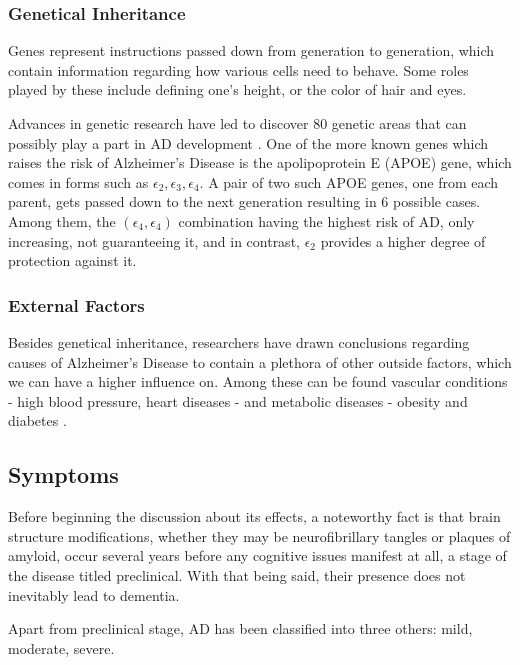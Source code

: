 \documentclass[a4paper, 12pt]{article}
\begin{document}
\subsubsection*{Genetical Inheritance} %
Genes represent instructions passed down from generation to generation, which contain information regarding how various cells
need to behave. Some roles played by these include defining one's height, or the color of hair and eyes.

Advances in genetic research have led to discover 80 genetic areas that can possibly play a part in AD development \cite{NIH2}.
One of the more known genes which raises the risk of Alzheimer's Disease is the apolipoprotein E (APOE) gene, which comes in forms such as
$\epsilon_2, \epsilon_3, \epsilon_4$. A pair of two such APOE genes, one from each parent, gets passed down to the next generation
resulting in 6 possible cases. Among them, the $\left(\epsilon_4,\epsilon_4\right)$ combination having the highest risk of AD,
only increasing, not guaranteeing it, and in contrast, $\epsilon_2$ provides a higher degree of protection against it.

\subsubsection*{External Factors} %
Besides genetical inheritance, researchers have drawn conclusions regarding causes of Alzheimer's Disease to contain a plethora
of other outside factors, which we can have a higher influence on.
Among these can be found vascular conditions - high blood pressure, heart diseases - and metabolic diseases - obesity and diabetes
\cite{NIH2}.

\subsection{Symptoms} %
Before beginning the discussion about its effects, a noteworthy fact is that brain structure modifications, whether they may be
neurofibrillary tangles or plaques of amyloid, occur several years before any cognitive issues manifest at all, a stage of the disease titled
preclinical. With that being said, their presence does not inevitably lead to dementia.

Apart from preclinical stage, AD has been classified into three others: mild, moderate, severe.
\end{document}

